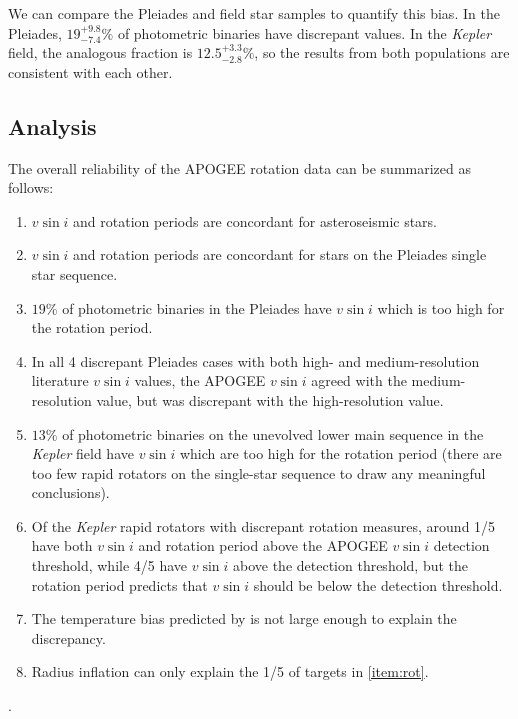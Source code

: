 \documentclass[preprint2]{aastex62}
\newcommand{\vsini}{\ensuremath{v \sin i}}
\newcommand{\Kepler}{\mbox{\textit{Kepler}}}
\begin{document}
We can compare the Pleiades and field star samples to quantify this bias. In 
the Pleiades, \(19^{+9.8}_{-7.4}\%\) of photometric binaries
have discrepant values. In the \Kepler{} field, the analogous fraction 
is \(12.5^{+3.3}_{-2.8}\%\), so the results from both populations are 
consistent with each other. 


\subsection{Analysis}

The overall reliability of the APOGEE rotation data can be summarized as follows:

\begin{enumerate}
    \item \vsini{} and rotation periods are concordant for asteroseismic stars.
    \item \vsini{} and rotation periods are concordant for stars on the Pleiades single star sequence.
    \item \(19\%\) of photometric binaries in the Pleiades have \vsini{} which is too high for the rotation period.
    \item In all 4 discrepant Pleiades cases with both high- and medium-resolution literature \vsini{} values, the APOGEE \vsini{} agreed with the medium-resolution value, but was discrepant with the high-resolution value.
    \item \(13\%\) of photometric binaries on the unevolved lower main sequence in the \Kepler{} field have \vsini{} which are too high for the rotation period (there are too few rapid rotators on the single-star sequence to draw any meaningful conclusions).
    \item\label{item:rot} Of the \Kepler{} rapid rotators with discrepant rotation measures, around 1/5 have both \vsini{} and rotation period above the APOGEE \vsini{} detection threshold, while 4/5 have \vsini{} above the detection threshold, but the rotation period predicts that \vsini{} should be below the detection threshold.
    \item The temperature bias predicted by \citep{ElBadry18a} is not large enough to explain the discrepancy.
    \item Radius inflation can only explain the 1/5 of targets in \cref{item:rot}.
\end{enumerate}.
\end{document}
